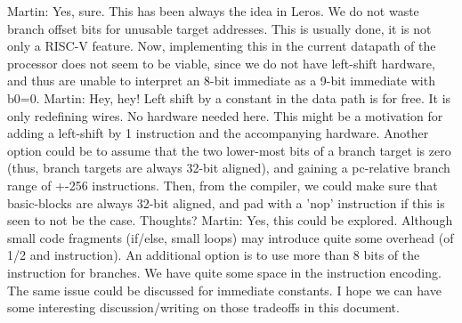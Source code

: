 \documentclass[a4paper,fontsize=10pt,twoside,DIV15,BCOR12mm,headinclude=true,footinclude=false,pagesize,bibtotoc]{scrbook}
\newcommand{\martin}[1]{{\color{blue} Martin: #1}}
\begin{document}
\begin{itemize}
\martin{Yes, sure. This has been always the idea in Leros. We do not waste branch offset bits for
unusable target addresses. This is usually done, it is not only a RISC-V feature.}
Now, implementing this in the current datapath of the processor does not seem to be viable, since we do not have left-shift hardware, and thus are unable to interpret an 8-bit immediate as a 9-bit immediate with b0=0. 
\martin{Hey, hey! Left shift by a constant in the data path is for free. It is only redefining wires.
No hardware needed here.}
This might be a motivation for adding a left-shift by 1 instruction and the accompanying hardware. 
Another option could be to assume that the two lower-most bits of a branch target is zero (thus, branch targets are always 32-bit aligned), and gaining a pc-relative branch range of +-256 instructions. Then, from the compiler, we could make sure that basic-blocks are always 32-bit aligned, and pad with a 'nop' instruction if this is seen to not be the case. 
Thoughts?
\martin{Yes, this could be explored. Although small code fragments (if/else, small loops) may introduce
quite some overhead (of 1/2 and instruction).
An additional option is to use more than 8 bits of the instruction for branches. We have quite some
space in the instruction encoding. The same issue could be discussed for immediate constants.
I hope we can have some interesting discussion/writing on those tradeoffs in this document.}
\end{itemize}
\end{document}
